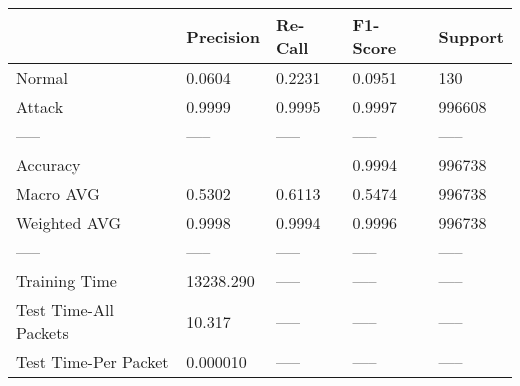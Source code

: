 \begin{tabular}{lllll}
\toprule
{} &  Precision & Re-Call & F1-Score & Support \\
\midrule
Normal                &     0.0604 &  0.2231 &   0.0951 &     130 \\
Attack                &     0.9999 &  0.9995 &   0.9997 &  996608 \\
-----                 &      ----- &   ----- &    ----- &   ----- \\
Accuracy              &            &         &   0.9994 &  996738 \\
Macro AVG             &     0.5302 &  0.6113 &   0.5474 &  996738 \\
Weighted AVG          &     0.9998 &  0.9994 &   0.9996 &  996738 \\
-----                 &      ----- &   ----- &    ----- &   ----- \\
Training Time         &  13238.290 &   ----- &    ----- &   ----- \\
Test Time-All Packets &     10.317 &   ----- &    ----- &   ----- \\
Test Time-Per Packet  &   0.000010 &   ----- &    ----- &   ----- \\
\bottomrule
\end{tabular}
